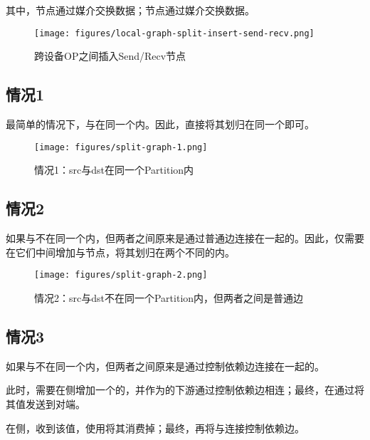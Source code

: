 \begin{content}
其中，节点通过媒介交换数据；节点通过媒介交换数据。

\begin{figure}[H]
\centering
\texttt{[image: figures/local-graph-split-insert-send-recv.png]}
\caption{跨设备OP之间插入Send/Recv节点}
 \label{fig:local-graph-split-insert-send-recv}
\end{figure}

\subsection{情况1}

最简单的情况下，与在同一个内。因此，直接将其划归在同一个即可。

\begin{figure}[H]
\centering
\texttt{[image: figures/split-graph-1.png]}
\caption{情况1：src与dst在同一个Partition内}
 \label{fig:split-graph-1}
\end{figure}

\subsection{情况2}

如果与不在同一个内，但两者之间原来是通过普通边连接在一起的。因此，仅需要在它们中间增加与节点，将其划归在两个不同的内。

\begin{figure}[H]
\centering
\texttt{[image: figures/split-graph-2.png]}
\caption{情况2：src与dst不在同一个Partition内，但两者之间是普通边}
 \label{fig:split-graph-2}
\end{figure}

\subsection{情况3}

如果与不在同一个内，但两者之间原来是通过控制依赖边连接在一起的。

此时，需要在侧增加一个的，并作为的下游通过控制依赖边相连；最终，在通过将其值发送到对端。

在侧，收到该值，使用将其消费掉；最终，再将与连接控制依赖边。


\end{content}
